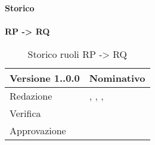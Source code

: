 \newpage
\Large{\textbf{Storico }}\\
\normalsize \\

\noindent \textbf{RP -> RQ}
\label{tabVers1}
\begin{table}[h]
	\begin{tabular}{p{} p{}}
		\toprule \textbf{Versione 1..0.0}	&	\textbf{Nominativo}\\
		\midrule Redazione	& \FM, \VG, \TP, \BM\\
		\midrule Verifica & \PM \\
		\midrule Approvazione	& \FM\\
		\bottomrule
	\end{tabular}
	\caption{Storico ruoli RP -> RQ}
\end{table}
